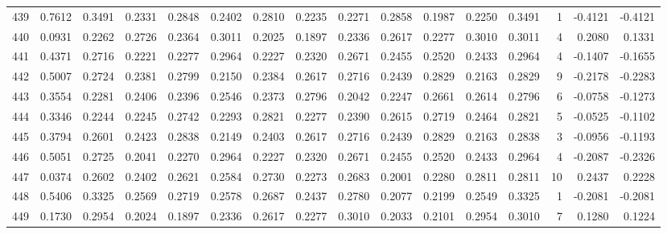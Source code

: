 \begin{tabular}{lrrrrrrrrrrrrrrr}
439 &      0.7612 &  0.3491 &  0.2331 &  0.2848 &  0.2402 &  0.2810 &  0.2235 &  0.2271 &  0.2858 &  0.1987 &   0.2250 &     0.3491 &      1 &                   -0.4121 &                    -0.4121 \\
440 &      0.0931 &  0.2262 &  0.2726 &  0.2364 &  0.3011 &  0.2025 &  0.1897 &  0.2336 &  0.2617 &  0.2277 &   0.3010 &     0.3011 &      4 &                    0.2080 &                     0.1331 \\
441 &      0.4371 &  0.2716 &  0.2221 &  0.2277 &  0.2964 &  0.2227 &  0.2320 &  0.2671 &  0.2455 &  0.2520 &   0.2433 &     0.2964 &      4 &                   -0.1407 &                    -0.1655 \\
442 &      0.5007 &  0.2724 &  0.2381 &  0.2799 &  0.2150 &  0.2384 &  0.2617 &  0.2716 &  0.2439 &  0.2829 &   0.2163 &     0.2829 &      9 &                   -0.2178 &                    -0.2283 \\
443 &      0.3554 &  0.2281 &  0.2406 &  0.2396 &  0.2546 &  0.2373 &  0.2796 &  0.2042 &  0.2247 &  0.2661 &   0.2614 &     0.2796 &      6 &                   -0.0758 &                    -0.1273 \\
444 &      0.3346 &  0.2244 &  0.2245 &  0.2742 &  0.2293 &  0.2821 &  0.2277 &  0.2390 &  0.2615 &  0.2719 &   0.2464 &     0.2821 &      5 &                   -0.0525 &                    -0.1102 \\
445 &      0.3794 &  0.2601 &  0.2423 &  0.2838 &  0.2149 &  0.2403 &  0.2617 &  0.2716 &  0.2439 &  0.2829 &   0.2163 &     0.2838 &      3 &                   -0.0956 &                    -0.1193 \\
446 &      0.5051 &  0.2725 &  0.2041 &  0.2270 &  0.2964 &  0.2227 &  0.2320 &  0.2671 &  0.2455 &  0.2520 &   0.2433 &     0.2964 &      4 &                   -0.2087 &                    -0.2326 \\
447 &      0.0374 &  0.2602 &  0.2402 &  0.2621 &  0.2584 &  0.2730 &  0.2273 &  0.2683 &  0.2001 &  0.2280 &   0.2811 &     0.2811 &     10 &                    0.2437 &                     0.2228 \\
448 &      0.5406 &  0.3325 &  0.2569 &  0.2719 &  0.2578 &  0.2687 &  0.2437 &  0.2780 &  0.2077 &  0.2199 &   0.2549 &     0.3325 &      1 &                   -0.2081 &                    -0.2081 \\
449 &      0.1730 &  0.2954 &  0.2024 &  0.1897 &  0.2336 &  0.2617 &  0.2277 &  0.3010 &  0.2033 &  0.2101 &   0.2954 &     0.3010 &      7 &                    0.1280 &                     0.1224 \\

\end{tabular}
